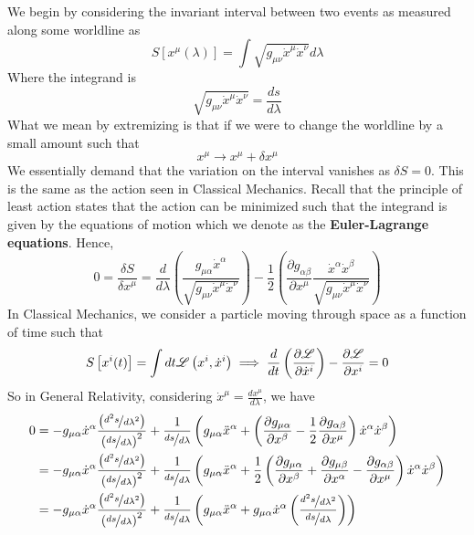 \documentclass{article}
\begin{document}
 			We begin by considering the invariant interval between two events as measured along some worldline as
 			\begin{equation}
 				\label{eq:IntervalWorldlineGR}
 				\boxed{S \left[ x^\mu (\lambda) \right] = \int \sqrt{g_{\mu\nu} \dot{x}^\mu \dot{x}^\nu} d\lambda}
 			\end{equation}
 			Where the integrand is 
 			$$\sqrt{g_{\mu\nu} \dot{x}^\mu \dot{x}^\nu} = \frac{ds}{d\lambda}$$
 			What we mean by extremizing is that if we were to change the worldline by a small amount such that
 			$$ x^\mu \to x^\mu + \delta x^\mu$$
 			We essentially demand that the variation on the interval vanishes as $\delta S=0$. This is the same as the action seen in Classical Mechanics. Recall that the principle of least action states that the action can be minimized such that the integrand is given by the equations of motion which we denote as the \textbf{Euler-Lagrange equations}. Hence,
 			\begin{equation}
 				\label{eq:2.17}
 				\boxed{0 = \frac{\delta S}{\delta x^\mu} = \frac{d}{d\lambda} \left( \frac{g_{\mu\alpha} \dot{x}^\alpha}{\sqrt{g_{\mu\nu} \dot{x}^\mu \dot{x}^\nu}} \right) - \frac12 \left( \frac{\partial g_{\alpha\beta}}{\partial x^\mu}\frac{ \dot{x}^\alpha\dot{x}^\beta}{\sqrt{g_{\mu\nu} \dot{x}^\mu \dot{x}^\nu}}\right)}
 			\end{equation}
 			In Classical Mechanics, we consider a particle moving through space as a function of time such that
 			$$ S \left[ x^i (t)\right] = \int dt \mathscr{L} \left( x^i, \dot{x}^i \right)\implies \frac{d}{dt} \left( \frac{\partial \mathscr{L}}{\partial \dot{x}^i}\right) - \frac{\partial \mathscr{L}}{\partial x^i} = 0$$
 			So in General Relativity, considering $\dot{x}^\mu = \frac{d x^\mu}{d\lambda}$, we have
 			\begin{align*}
 				0 &= -g_{\mu\alpha} \dot{x}^\alpha \frac{\left(\nicefrac{d^2s}{d\lambda^2}\right)}{\left(\nicefrac{ds}{d\lambda}\right)^2} + \frac{1}{\nicefrac{ds}{d\lambda}} \left( g_{\mu \alpha} \ddot{x}^\alpha + \left(\frac{\partial g_{\mu\alpha}}{\partial x^\beta} - \frac12 \frac{\partial g_{\alpha \beta}}{\partial x^\mu} \right)\dot{x}^\alpha \dot{x}^\beta \right)  \\
 				&= -g_{\mu\alpha} \dot{x}^\alpha \frac{\left(\nicefrac{d^2s}{d\lambda^2}\right)}{\left(\nicefrac{ds}{d\lambda}\right)^2} + \frac{1}{\nicefrac{ds}{d\lambda}} \left( g_{\mu \alpha} \ddot{x}^\alpha + \frac12\left(\frac{\partial g_{\mu\alpha}}{\partial x^\beta} +\frac{\partial g_{\mu\beta}}{\partial x^\alpha} -  \frac{\partial g_{\alpha \beta}}{\partial x^\mu} \right)\dot{x}^\alpha \dot{x}^\beta\right) \\
 				&= -g_{\mu\alpha} \dot{x}^\alpha \frac{\left(\nicefrac{d^2s}{d\lambda^2}\right)}{\left(\nicefrac{ds}{d\lambda}\right)^2} + \frac{1}{\nicefrac{ds}{d\lambda}} \left( g_{\mu \alpha} \ddot{x}^\alpha + g_{\mu\alpha} \dot{x}^\alpha \left(\frac{\nicefrac{d^2s}{d\lambda^2}}{\nicefrac{ds}{d\lambda}}\right)\right)
 			\end{align*}
\end{document}
